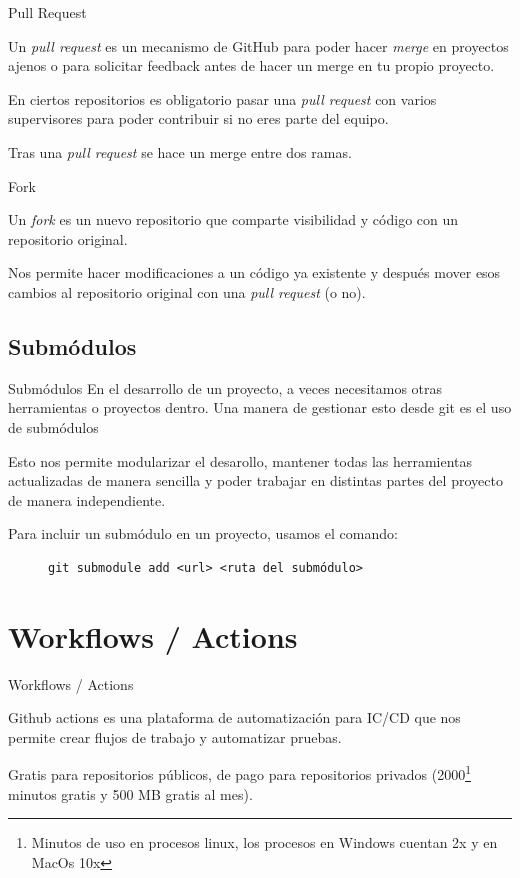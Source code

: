 \documentclass{beamer}
\begin{document}
\begin{frame}{Pull Request}

    Un \textit{pull request} es un mecanismo de GitHub para poder hacer \textit{merge} en proyectos ajenos o para solicitar feedback antes de hacer un merge en tu propio proyecto.

    En ciertos repositorios es obligatorio pasar una \textit{pull request} con varios supervisores para poder contribuir si no eres parte del equipo.

    Tras una \textit{pull request} se hace un merge entre dos ramas.
\end{frame}

\begin{frame}{Fork}

    Un \textit{fork} es un nuevo repositorio que comparte visibilidad y código con un repositorio original.

    Nos permite hacer modificaciones a un código ya existente y después mover esos cambios al repositorio original con una \textit{pull request} (o no).

\end{frame}

\subsection{Submódulos}
\begin{frame}{Submódulos}
    En el desarrollo de un proyecto, a veces necesitamos otras herramientas o proyectos dentro. Una manera de gestionar esto desde git es el uso de submódulos

    Esto nos permite modularizar el desarollo, mantener todas las herramientas actualizadas de manera sencilla y poder trabajar en distintas partes del proyecto de manera independiente.
\end{frame}

\begin{frame}[fragile]
    Para incluir un submódulo en un proyecto, usamos el comando:

    \begin{figure}
        \begin{lstlisting}[style=custombash]
git submodule add <url> <ruta del submódulo>\end{lstlisting}
    \end{figure}
\end{frame}

\section{Workflows / Actions}
\begin{frame}{Workflows / Actions}

    Github actions es una plataforma de automatización para IC/CD que nos permite crear flujos de trabajo y automatizar pruebas.

    Gratis para repositorios públicos, de pago para repositorios privados (2000\footnote[1]{Minutos de uso en procesos linux, los procesos en Windows cuentan 2x y en MacOs 10x} minutos gratis y 500 MB gratis al mes).


\end{frame}
\end{document}
